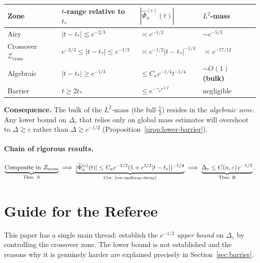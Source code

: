 \documentclass[12pt,a4paper]{amsart}
\theoremstyle{definition}
\theoremstyle{remark}
\newcommand{\Zcross}{\mathcal{Z}_{\mathrm{cross}}}
\begin{document}
\begin{center}
\renewcommand{\arraystretch}{1.4}
\begin{tabular}{llll}
\toprule
Zone & $t$-range relative to $t_*$
& $|\widehat{\Phi}_n^{(c)}(t)|$
& $L^2$-mass \\
\midrule
Airy & $|t-t_*| \lesssim c^{-2/3}$
& $\asymp c^{-1/2}$
& $\sim c^{-5/3}$ \\
Crossover $\Zcross$
& $c^{-2/3} \le |t-t_*| \le c^{-1/3}$
& $\asymp c^{-1/2}|t-t_*|^{-1/4}$
& $\asymp c^{-17/12}$ \\
Algebraic & $|t-t_*| \ge c^{-1/3}$
& $\le C_\kappa c^{-1/4}t^{-1/4}$
& $\sim O(1)$ \textbf{(bulk)} \\
Barrier & $t \ge 2t_*$
& $\le e^{-\gamma_\kappa c^{1/2}}$
& negligible \\
\bottomrule
\end{tabular}
\end{center}

\noindent\textbf{Consequence.}
The bulk of the $L^2$-mass (the full $\tfrac{1}{2}$)
resides in the \emph{algebraic zone}.
Any lower bound on $\Delta_\varepsilon$
that relies only on global mass estimates
will overshoot to $\Delta \gtrsim c$
rather than $\Delta \gtrsim c^{-1/2}$
(Proposition~\ref{prop:lower-barrier}).

\paragraph{Chain of rigorous results.}
\[
\underbrace{\text{Composite in }\Zcross}
_{\text{Thm.~A}}
\;\Longrightarrow\;
\underbrace{|\widehat{\Phi}_n^{(c)}(t)|
\le C_\kappa c^{-1/2}(1+c^{1/2}|t-t_*|)^{-1/4}}
_{\text{Cor.~\ref{cor:uniform-decay}}}
\;\Longrightarrow\;
\underbrace{\Delta_\varepsilon \le C(\kappa,\varepsilon)\,c^{-1/2}}
_{\text{Thm.~B}}.
\]

\section*{Guide for the Referee}

This paper has a single main thread:
establish the $c^{-1/2}$ \emph{upper bound} on $\Delta_\varepsilon$
by controlling the crossover zone.
The lower bound is not established and the reasons
why it is genuinely harder are explained precisely
in Section~\ref{sec:barrier}.
\end{document}

